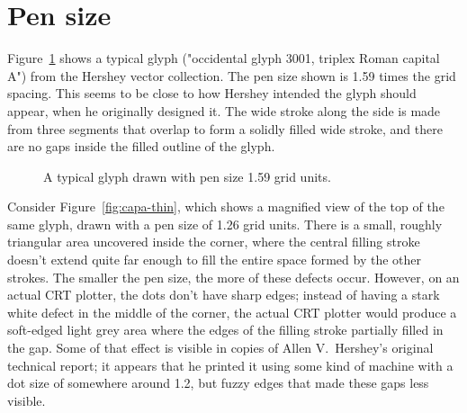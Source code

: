 \documentclass{article}
\newcommand{\SegRad}{0.79}
\newcommand{\FatSegment}[2]{%
($(#1)!\SegRad cm!90:(#2)$) %
  ..controls ($(#1)!1.12*\SegRad cm!120:(#2)$) %
         and ($(#1)!1.12*\SegRad cm!150:(#2)$).. %
($(#1)!-\SegRad cm!0:(#2)$) %
  ..controls ($(#1)!1.12*\SegRad cm!-150:(#2)$) %
         and ($(#1)!1.12*\SegRad cm!-120:(#2)$).. %
($(#1)!\SegRad cm!-90:(#2)$) -- %
($(#2)!\SegRad cm!90:(#1)$) %
  ..controls ($(#2)!1.12*\SegRad cm!120:(#1)$) %
         and ($(#2)!1.12*\SegRad cm!150:(#1)$).. %
($(#2)!-\SegRad cm!0:(#1)$) %
  ..controls ($(#2)!1.12*\SegRad cm!-150:(#1)$) %
         and ($(#2)!1.12*\SegRad cm!-120:(#1)$).. %
($(#2)!\SegRad cm!-90:(#1)$) -- %
cycle %
}
\begin{document}

\section{Pen size}

Figure~\ref{fig:capa-normal} shows a typical glyph ("occidental glyph 3001,
triplex Roman capital A") from the Hershey vector collection.  The pen size
shown is 1.59 times the grid spacing.  This seems to be close to how Hershey
intended the glyph should appear, when he originally designed it.  The wide
stroke along the side is made from three segments that overlap to form a
solidly filled wide stroke, and there are no gaps inside the filled outline
of the glyph.

\begin{figure}
  \centering\renewcommand{\SegRad}{0.79}
  \caption{A typical glyph drawn with pen size 1.59 grid units.}
  \label{fig:capa-normal}
\end{figure}

Consider Figure~\ref{fig:capa-thin}, which shows a magnified view of the top
of the same glyph, drawn with a pen size of 1.26 grid units.  There is a
small, roughly triangular area uncovered inside the corner, where the
central filling stroke doesn't extend quite far enough to fill the entire
space formed by the other strokes.  The smaller the pen size, the more of
these defects occur.  However, on an actual CRT plotter, the dots don't have
sharp edges; instead of having a stark white defect in the middle of the
corner, the actual CRT plotter would produce a soft-edged light grey area
where the edges of the filling stroke partially filled in the gap.  Some of
that effect is visible in copies of Allen V.\ Hershey's original technical
report; it appears that he printed it using some kind of machine with a dot
size of somewhere around 1.2, but fuzzy edges that made these gaps less
visible.
\end{document}

